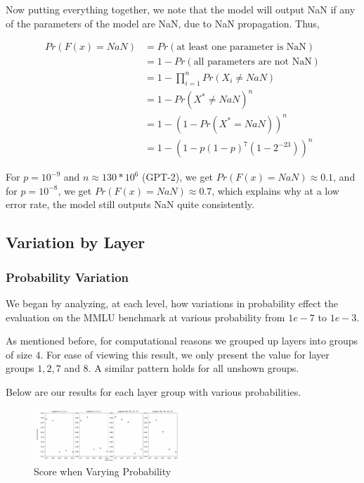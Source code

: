 Now putting everything together, we note that the model will output NaN if any of the parameters of the model are NaN, due to NaN propagation. Thus,

\begin{align*}
	Pr(F(x) = NaN) &= Pr(\text{at least one parameter is NaN}) \\
	&= 1 - Pr(\text{all parameters are not NaN}) \\
	&= 1 - \prod_{i=1}^n Pr(X_i \neq NaN) \\
	&= 1 - Pr(X^* \neq NaN)^n \\
	&= 1 - (1 - Pr(X^* = NaN))^n \\
	&= 1 - (1 - p(1 - p)^7(1 - 2^{-23}))^n
\end{align*}

For $p = 10^{-9}$ and $n \approx 130 * 10^6$ (GPT-2), we get $Pr(F(x) = NaN) \approx 0.1$, and for $p = 10^{-8}$, we get $Pr(F(x) = NaN) \approx 0.7$, which explains why at a low error rate, the model still outputs NaN quite consistently.

\subsection{Variation by Layer}

\subsubsection{Probability Variation}
We began by analyzing, at each level, how variations in probability effect the evaluation on the MMLU benchmark at various probability from $1e-7$ to $1e-3$.

As mentioned before, for computational reasons we grouped up layers into groups of size $4$. For ease of viewing this result, we only present the value for layer groups $1, 2, 7$ and $8$. A similar pattern
holds for all unshown groups.

Below are our results for each layer group with various probabilities.

\begin{figure}[!htbp]
    \centering
    \includegraphics[width=0.5\textwidth]{images/varyprob.png}
    \caption{Score when Varying Probability}
    \label{fig:varyprob}
\end{figure}

